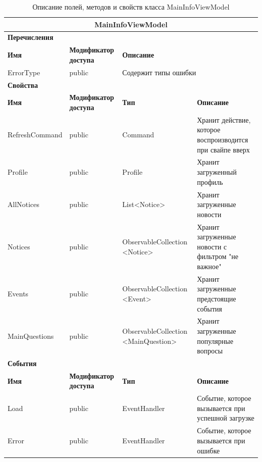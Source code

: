 \documentclass{../includes/TechDoc}
\begin{document}
    \begin{table}[ht]
        \caption{\label{tab:class-maininfoviewmodel-table}Описание полей, методов и свойств класса MainInfoViewModel}
        \centering
        \begin{tabular}{|p{3.2cm}|p{3cm}|p{3.8cm}|p{3cm}|p{3cm}|}
            \hline
            \multicolumn{5}{|c|}{MainInfoViewModel} \\ \hline
            \multicolumn{5}{|l|}{\textbf{Перечисления}} \\ \hline
            \textbf{Имя} & \textbf{Модификатор доступа} & \multicolumn{3}{p{5cm}|}{\textbf{Описание}} \\ \hline
            ErrorType & public & \multicolumn{3}{l|}{Содержит типы ошибки} \\ \hline
            \multicolumn{5}{|l|}{\textbf{Свойства}} \\ \hline
            \textbf{Имя} & \textbf{Модификатор доступа} & \textbf{Тип} & \multicolumn{2}{p{6.8cm}|}{\textbf{Описание}} \\ \hline
            RefreshCommand & public & Command & \multicolumn{2}{p{6.8cm}|}{Хранит действие, которое воспроизводится при свайпе вверх} \\ \hline
            Profile & public & Profile & \multicolumn{2}{p{6.8cm}|}{Хранит загруженный профиль} \\ \hline
            AllNotices & public & List<Notice> & \multicolumn{2}{p{6.8cm}|}{Хранит загруженные новости} \\ \hline
            Notices & public & ObservableCollection <Notice> & \multicolumn{2}{p{6.8cm}|}{Хранит загруженные новости с фильтром "не важное"} \\ \hline
            Events & public & ObservableCollection <Event> & \multicolumn{2}{p{6.8cm}|}{Хранит загруженные предстоящие события} \\ \hline
            MainQuestions & public & ObservableCollection <MainQuestion> & \multicolumn{2}{p{6.8cm}|}{Хранит загруженные популярные вопросы} \\ \hline
            \multicolumn{5}{|l|}{\textbf{События}} \\ \hline
            \textbf{Имя} & \textbf{Модификатор доступа} & \textbf{Тип} & \multicolumn{2}{p{6.8cm}|}{\textbf{Описание}} \\ \hline
            Load & public & EventHandler & \multicolumn{2}{p{6.8cm}|}{Событие, которое вызывается при успешной загрузке} \\ \hline
            Error & public & EventHandler & \multicolumn{2}{p{6.8cm}|}{Событие, которое вызывается при ошибке} \\ \hline

\end{tabular}
\end{table}
\end{document}
